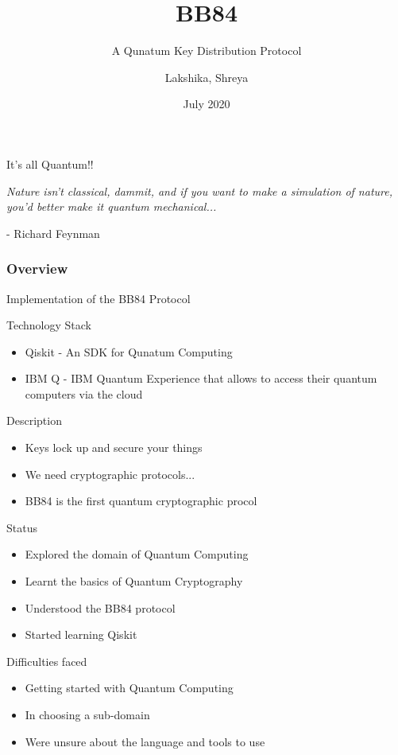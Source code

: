 \documentclass[14 pt]{beamer}
\title[BB84]{BB84}
\subtitle{A Qunatum Key Distribution Protocol}
\author[Team 37]{Lakshika, Shreya}
\date{July 2020}
\begin{document}
\begin{frame}
	\titlepage
\end{frame}

\begin{frame}{It's all Quantum!!}
    \begin{center}
        \emph{Nature isn’t classical, dammit,
and if you want to make a simulation of nature, you’d better make it quantum mechanical...}
    \end{center}
    \begin{flushright}
        - Richard Feynman
    \end{flushright}
\end{frame}


\begin{frame}
	\frametitle{Overview}
	 Implementation of the BB84 Protocol
\end{frame}

\begin{frame}{Technology Stack}
	\begin{itemize}
		\item Qiskit - An SDK for Qunatum Computing
		\item IBM Q - IBM Quantum Experience that allows to access their quantum computers via the cloud
	\end{itemize}
\end{frame}

\begin{frame}{Description}
    \begin{itemize}[<+->] 
        \item Keys lock up and secure your things
        \item We need cryptographic protocols...
        \item BB84 is the first quantum cryptographic procol
    \end{itemize}
\end{frame}

\begin{frame}{Status}
	\begin{itemize}
		\item Explored the domain of Quantum Computing
        \item Learnt the basics of Quantum Cryptography
        \item Understood the BB84 protocol
        \item Started learning Qiskit
	\end{itemize}
\end{frame}

\begin{frame}{Difficulties faced}
	\begin{itemize}
		\item Getting started with Quantum Computing
        \item In choosing a sub-domain
        \item Were unsure about the language and tools to use
	\end{itemize}
\end{frame}
		
\end{document}
